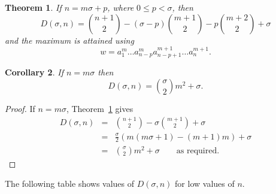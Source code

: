 \documentclass[11pt]{amsart}
\newcommand{\1}{\bar{1}}
\theoremstyle{plain}
\newtheorem{theorem}{Theorem}
\newtheorem{corollary}[theorem]{Corollary}
\theoremstyle{definition}
\theoremstyle{remark}
\begin{document}
\begin{theorem} \label{T1} If $n=m\sigma +p$, where $0 \le p <\sigma$, then
\begin{equation}
\label{e2}
D(\sigma,n) = {n+1 \choose 2} - (\sigma-p){m+1 \choose 2} - p{m+2 \choose 2} + \sigma
\end{equation}
and the maximum is attained using
$$w=a_1^m \dots a_{n-p}^m a_{n-p+1}^{m+1} \dots a_n^{m+1}.$$
\end{theorem}
\begin{corollary}
If $n=m\sigma $ then
$$D(\sigma,n) = {\sigma \choose 2} m^2 + \sigma.$$
\end{corollary}
\begin{proof}
If $n=m\sigma$, Theorem~\ref{T1} gives
\begin{eqnarray*}
D(\sigma,n) &=& {n+1 \choose 2} - \sigma{m+1 \choose 2} + \sigma \\
&=& \frac{\sigma}{2}(m (m \sigma+1)-(m+1)m )+\sigma\\
&=& {\sigma \choose 2} m^2+\sigma \qquad \mbox{as required}.
\end{eqnarray*}  \vspace*{-2em}
\end{proof}

The following table shows values of $D(\sigma,n)$ for low values of $n$.
\end{document}
